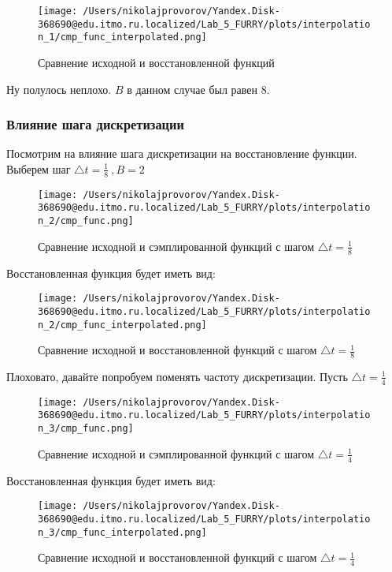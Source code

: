 \begin{figure}[ht!]
    \centering
    \texttt{[image: /Users/nikolajprovorov/Yandex.Disk-368690@edu.itmo.ru.localized/Lab\_5\_FURRY/plots/interpolation\_1/cmp\_func\_interpolated.png]}
    \caption{Сравнение исходной и восстановленной функций}
\end{figure}

Ну полулось неплохо. $B$ в данном случае был равен 8.

\clearpage

\subsubsection{Влияние шага дискретизации}

Посмотрим на влияние шага дискретизации на восстановление функции. Выберем шаг $\triangle t = \frac{1}{8}~, B = 2$

\begin{figure}[ht!]
    \centering
    \texttt{[image: /Users/nikolajprovorov/Yandex.Disk-368690@edu.itmo.ru.localized/Lab\_5\_FURRY/plots/interpolation\_2/cmp\_func.png]}
    \caption{Сравнение исходной и сэмплированной функций с шагом $\triangle t = \frac{1}{8}$}
\end{figure}

Восстановленная функция будет иметь вид:

\begin{figure}[ht!]
    \centering
    \texttt{[image: /Users/nikolajprovorov/Yandex.Disk-368690@edu.itmo.ru.localized/Lab\_5\_FURRY/plots/interpolation\_2/cmp\_func\_interpolated.png]}
    \caption{Сравнение исходной и восстановленной функций с шагом $\triangle t = \frac{1}{8}$}
\end{figure}

Плоховато, давайте попробуем поменять частоту дискретизации. Пусть $\triangle t = \frac{1}{4}$

\clearpage

\begin{figure}[ht!]
    \centering
    \texttt{[image: /Users/nikolajprovorov/Yandex.Disk-368690@edu.itmo.ru.localized/Lab\_5\_FURRY/plots/interpolation\_3/cmp\_func.png]}
    \caption{Сравнение исходной и сэмплированной функций с шагом $\triangle t = \frac{1}{4}$}
\end{figure}

Восстановленная функция будет иметь вид:

\begin{figure}[ht!]
    \centering
    \texttt{[image: /Users/nikolajprovorov/Yandex.Disk-368690@edu.itmo.ru.localized/Lab\_5\_FURRY/plots/interpolation\_3/cmp\_func\_interpolated.png]}
    \caption{Сравнение исходной и восстановленной функций с шагом $\triangle t = \frac{1}{4}$}
\end{figure}


